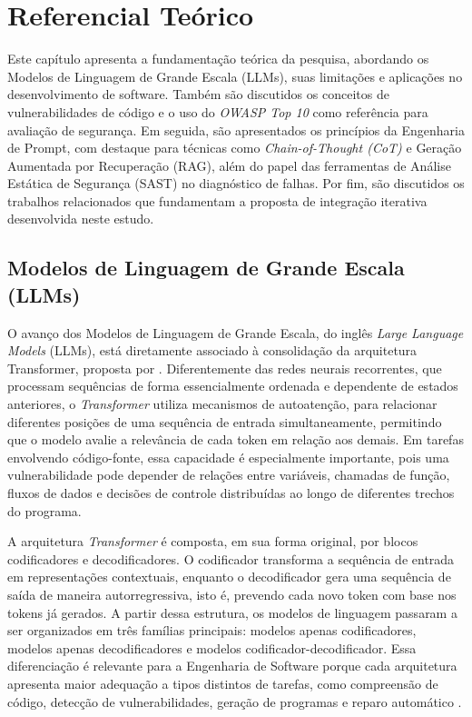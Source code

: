 
\chapter[Referencial Teórico]{Referencial Teórico}

Este capítulo apresenta a fundamentação teórica da pesquisa, abordando os Modelos de Linguagem de Grande Escala (LLMs), suas limitações e aplicações no desenvolvimento de software. Também são discutidos os conceitos de vulnerabilidades de código e o uso do \textit{OWASP Top 10} como referência para avaliação de segurança. Em seguida, são apresentados os princípios da Engenharia de Prompt, com destaque para técnicas como \textit{Chain-of-Thought (CoT)} e Geração Aumentada por Recuperação (RAG), além do papel das ferramentas de Análise Estática de Segurança (SAST) no diagnóstico de falhas. Por fim, são discutidos os trabalhos relacionados que fundamentam a proposta de integração iterativa desenvolvida neste estudo.


\section{Modelos de Linguagem de Grande Escala (LLMs)}

O avanço dos Modelos de Linguagem de Grande Escala, do inglês \textit{Large Language Models} (LLMs), está diretamente associado à consolidação da arquitetura Transformer, proposta por \cite{vaswani_attention_2023}. Diferentemente das redes neurais recorrentes, que processam sequências de forma essencialmente ordenada e dependente de estados anteriores, o \textit{Transformer} utiliza mecanismos de autoatenção, para relacionar diferentes posições de uma sequência de entrada simultaneamente, permitindo que o modelo avalie a relevância de cada token em relação aos demais. Em tarefas envolvendo código-fonte, essa capacidade é especialmente importante, pois uma vulnerabilidade pode depender de relações entre variáveis, chamadas de função, fluxos de dados e decisões de controle distribuídas ao longo de diferentes trechos do programa.

A arquitetura \textit{Transformer} é composta, em sua forma original, por blocos codificadores e decodificadores. O codificador transforma a sequência de entrada em representações contextuais, enquanto o decodificador gera uma sequência de saída de maneira autorregressiva, isto é, prevendo cada novo token com base nos tokens já gerados. A partir dessa estrutura, os modelos de linguagem passaram a ser organizados em três famílias principais: modelos apenas codificadores, modelos apenas decodificadores e modelos codificador-decodificador. Essa diferenciação é relevante para a Engenharia de Software porque cada arquitetura apresenta maior adequação a tipos distintos de tarefas, como compreensão de código, detecção de vulnerabilidades, geração de programas e reparo automático \cite{vaswani_attention_2023}.

